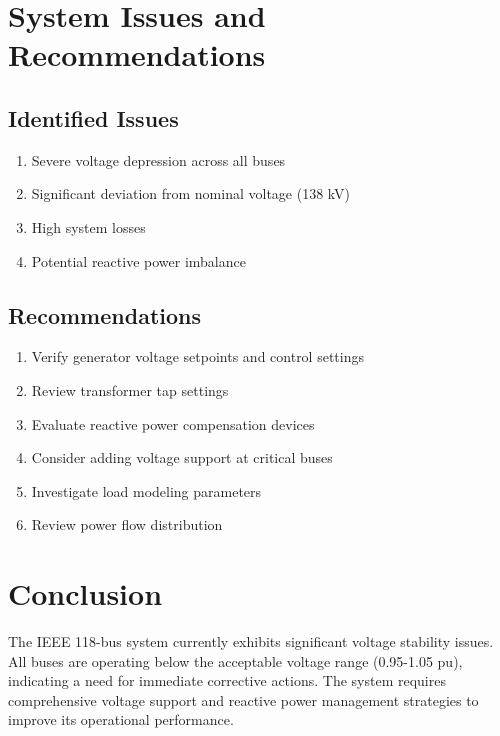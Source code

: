 \documentclass[11pt]{article}
\begin{document}
\section{System Issues and Recommendations}

\subsection{Identified Issues}
\begin{enumerate}
    \item Severe voltage depression across all buses
    \item Significant deviation from nominal voltage (138 kV)
    \item High system losses
    \item Potential reactive power imbalance
\end{enumerate}

\subsection{Recommendations}
\begin{enumerate}
    \item Verify generator voltage setpoints and control settings
    \item Review transformer tap settings
    \item Evaluate reactive power compensation devices
    \item Consider adding voltage support at critical buses
    \item Investigate load modeling parameters
    \item Review power flow distribution
\end{enumerate}

\section{Conclusion}
The IEEE 118-bus system currently exhibits significant voltage stability issues. All buses are operating below the acceptable voltage range (0.95-1.05 pu), indicating a need for immediate corrective actions. The system requires comprehensive voltage support and reactive power management strategies to improve its operational performance.
\end{document}

